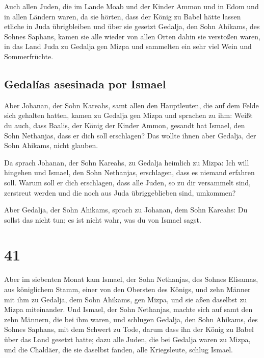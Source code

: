  Auch allen Juden, die im Lande Moab und der Kinder Ammon
und in Edom und in allen Ländern waren, da sie hörten, dass der König zu
Babel hätte lassen etliche in Juda übrigbleiben und über sie gesetzt
Gedalja, den Sohn Ahikams, des Sohnes Saphans,  kamen sie
alle wieder von allen Orten dahin sie verstoßen waren, in das Land Juda
zu Gedalja gen Mizpa und sammelten ein sehr viel Wein und Sommerfrüchte.

\hypertarget{gedaluxedas-asesinada-por-ismael}{%
\subsection{Gedalías asesinada por
Ismael}\label{gedaluxedas-asesinada-por-ismael}}

 Aber Johanan, der Sohn Kareahs, samt allen den
Hauptleuten, die auf dem Felde sich gehalten hatten, kamen zu Gedalja
gen Mizpa  und sprachen zu ihm: Weißt du auch, dass
Baalis, der König der Kinder Ammon, gesandt hat Ismael, den Sohn
Nethanjas, dass er dich soll erschlagen? Das wollte ihnen aber Gedalja,
der Sohn Ahikams, nicht glauben.

 Da sprach Johanan, der Sohn Kareahs, zu Gedalja heimlich
zu Mizpa: Ich will hingehen und Ismael, den Sohn Nethanjas, erschlagen,
dass es niemand erfahren soll. Warum soll er dich erschlagen, dass alle
Juden, so zu dir versammelt sind, zerstreut werden und die noch aus Juda
übriggeblieben sind, umkommen?

 Aber Gedalja, der Sohn Ahikams, sprach zu Johanan, dem
Sohn Kareahs: Du sollst das nicht tun; es ist nicht wahr, was du von
Ismael sagst.

\hypertarget{section-40}{%
\section{41}\label{section-40}}

 Aber im siebenten Monat kam Ismael, der Sohn Nethanjas,
des Sohnes Elisamas, aus königlichem Stamm, einer von den Obersten des
Königs, und zehn Männer mit ihm zu Gedalja, dem Sohn Ahikams, gen Mizpa,
und sie aßen daselbst zu Mizpa miteinander.  Und Ismael,
der Sohn Nethanjas, machte sich auf samt den zehn Männern, die bei ihm
waren, und schlugen Gedalja, den Sohn Ahikams, des Sohnes Saphans, mit
dem Schwert zu Tode, darum dass ihn der König zu Babel über das Land
gesetzt hatte;  dazu alle Juden, die bei Gedalja waren zu
Mizpa, und die Chaldäer, die sie daselbst fanden, alle Kriegsleute,
schlug Ismael.

